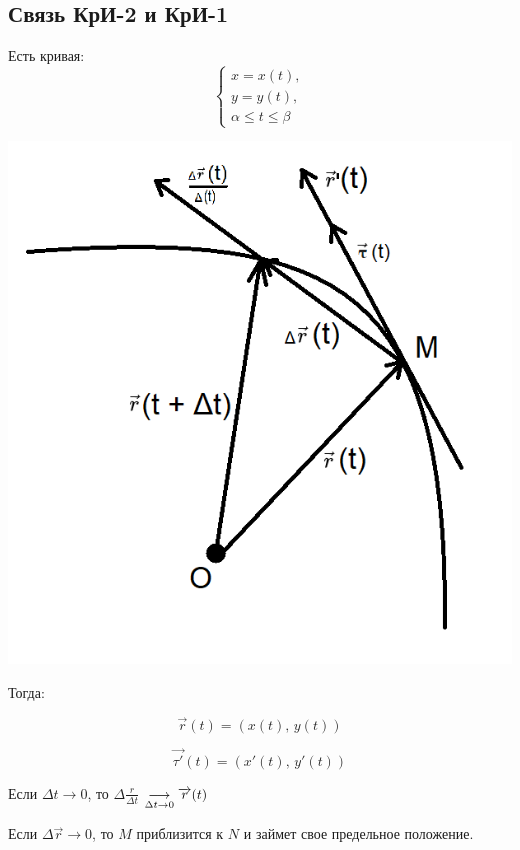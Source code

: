 \documentclass[../../main.tex]{subfiles}
\begin{document}
	\subsection{Связь КрИ-2 и КрИ-1}
	
	Есть кривая:
	\[
	\begin{cases}
	x = x \left( t \right),\\
	y = y \left( t \right),\\
	\alpha \leq t \leq \beta
	\end{cases}
	\]
	
	\begin{center}
		\includegraphics[scale = 0.8]{lec20_1.png}
	\end{center}
	
	Тогда:
	
	\[
	\overrightarrow{r} \left( t \right) = \left( x \left( t 
	\right),\, y \left( t \right) \right)
	\]
	
	\[
	\overrightarrow{\tau'} \left( t \right) = \left( x' \left( t 
	\right),\, y' \left( t \right) \right)
	\]
	
	Если $\Delta t \to 0$, то $\Delta\frac{r}{\Delta t}$
	$ \underset{\Delta t \to 0}\longrightarrow
	\overrightarrow{r}(t)$
	
	Если $\Delta \overrightarrow{r} \to 0$, то $M$ приблизится к $N$
	и займет свое предельное положение.
	
\end{document}

